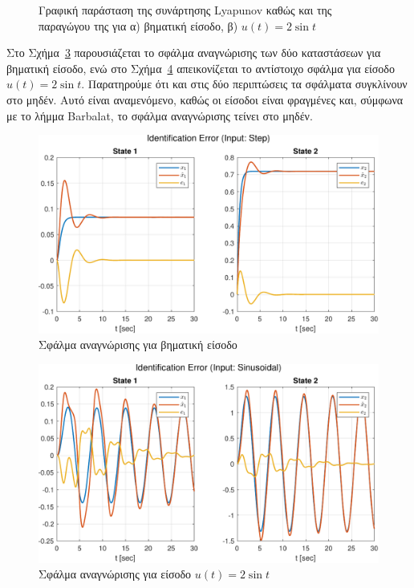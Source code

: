\documentclass[a4paper,12pt]{article}
\begin{document}
\begin{figure}[htbp]
\begin{subfigure}[b]{0.45\textwidth}
    \caption{}
    \label{fig:task1_lyapunov_sinusoidal}
  \end{subfigure}
  \caption{Γραφική παράσταση της συνάρτησης Lyapunov καθώς και
  της παραγώγου της για α) βηματική είσοδο, β) $u(t) = 2 \sin t$}
  \label{fig:task1_lyapunov}
\end{figure}

Στο Σχήμα~\ref{fig:task1_identification_error_step} παρουσιάζεται το σφάλμα αναγνώρισης των δύο καταστάσεων 
για βηματική είσοδο, ενώ στο Σχήμα~\ref{fig:task1_identification_error_sinusoidal} απεικονίζεται το αντίστοιχο 
σφάλμα για είσοδο $u(t) = 2 \sin t$. Παρατηρούμε ότι και στις δύο περιπτώσεις τα σφάλματα συγκλίνουν στο μηδέν. 
Αυτό είναι αναμενόμενο, καθώς οι είσοδοι είναι φραγμένες και, σύμφωνα με το λήμμα 
Barbalat, το σφάλμα αναγνώρισης τείνει στο μηδέν.

\begin{figure}
    \centering
    \includegraphics[width=1\linewidth]{plot/task1_identification_error_step.pdf}
    \caption{Σφάλμα αναγνώρισης για βηματική είσοδο}
    \label{fig:task1_identification_error_step}
\end{figure}

\begin{figure}
    \centering
    \includegraphics[width=1\linewidth]{plot/task1_identification_error_sinusoidal.pdf}
    \caption{Σφάλμα αναγνώρισης για είσοδο $u(t) = 2 \sin t$}
    \label{fig:task1_identification_error_sinusoidal}
\end{figure}
\end{document}
